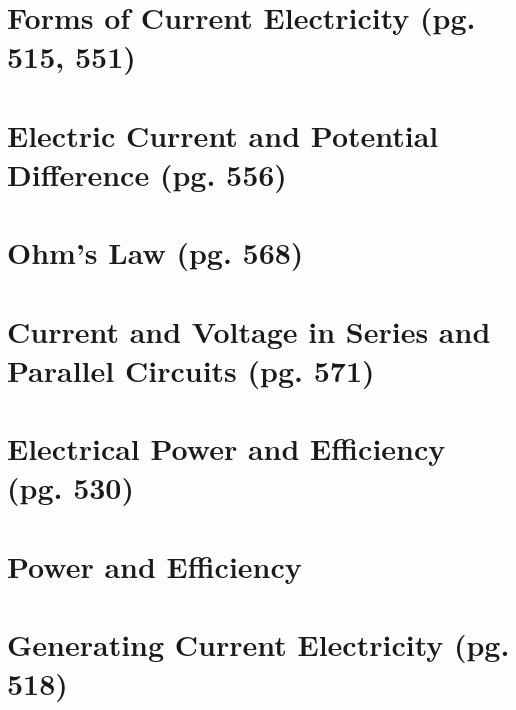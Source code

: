 \documentclass{article}
\begin{document}

\section{Forms of Current Electricity (pg. 515, 551)}


\section{Electric Current and Potential Difference (pg. 556)}


\section{Ohm's Law (pg. 568)}


\section{Current and Voltage in Series and Parallel Circuits (pg. 571)}


\section{Electrical Power and Efficiency (pg. 530)}


\section{Power and Efficiency}


\section{Generating Current Electricity (pg. 518)}

\end{document}
